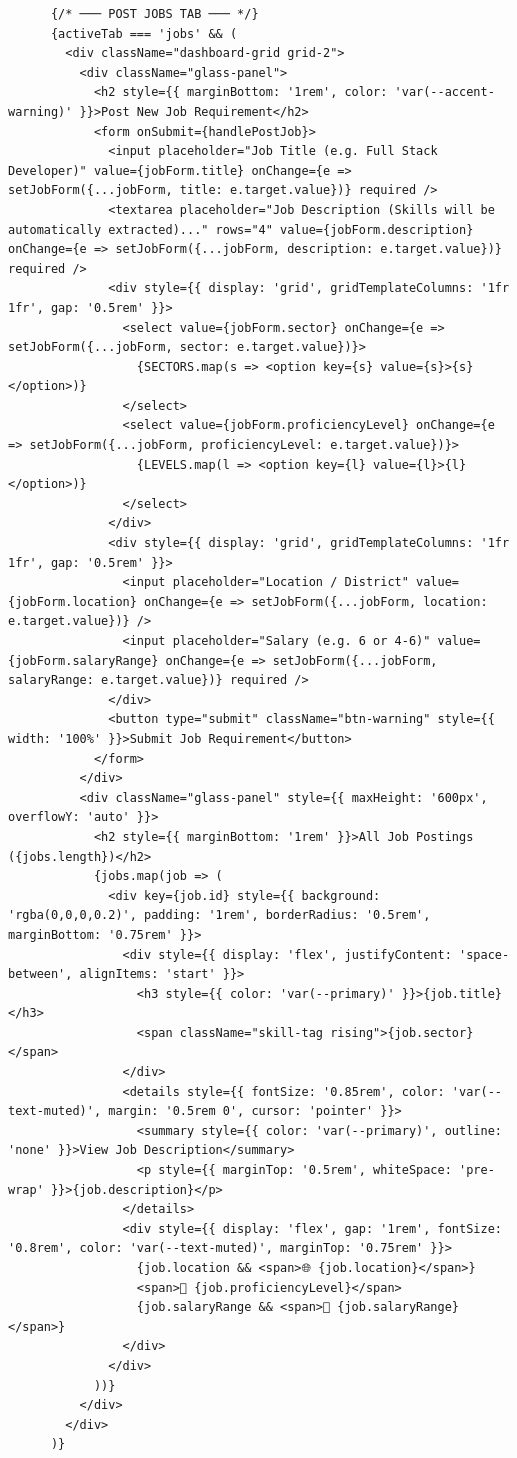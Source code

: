 \documentclass[12pt,a4paper]{report}
\begin{document}
\begin{verbatim}
      {/* ─── POST JOBS TAB ─── */}
      {activeTab === 'jobs' && (
        <div className="dashboard-grid grid-2">
          <div className="glass-panel">
            <h2 style={{ marginBottom: '1rem', color: 'var(--accent-warning)' }}>Post New Job Requirement</h2>
            <form onSubmit={handlePostJob}>
              <input placeholder="Job Title (e.g. Full Stack Developer)" value={jobForm.title} onChange={e => setJobForm({...jobForm, title: e.target.value})} required />
              <textarea placeholder="Job Description (Skills will be automatically extracted)..." rows="4" value={jobForm.description} onChange={e => setJobForm({...jobForm, description: e.target.value})} required />
              <div style={{ display: 'grid', gridTemplateColumns: '1fr 1fr', gap: '0.5rem' }}>
                <select value={jobForm.sector} onChange={e => setJobForm({...jobForm, sector: e.target.value})}>
                  {SECTORS.map(s => <option key={s} value={s}>{s}</option>)}
                </select>
                <select value={jobForm.proficiencyLevel} onChange={e => setJobForm({...jobForm, proficiencyLevel: e.target.value})}>
                  {LEVELS.map(l => <option key={l} value={l}>{l}</option>)}
                </select>
              </div>
              <div style={{ display: 'grid', gridTemplateColumns: '1fr 1fr', gap: '0.5rem' }}>
                <input placeholder="Location / District" value={jobForm.location} onChange={e => setJobForm({...jobForm, location: e.target.value})} />
                <input placeholder="Salary (e.g. 6 or 4-6)" value={jobForm.salaryRange} onChange={e => setJobForm({...jobForm, salaryRange: e.target.value})} required />
              </div>
              <button type="submit" className="btn-warning" style={{ width: '100%' }}>Submit Job Requirement</button>
            </form>
          </div>
          <div className="glass-panel" style={{ maxHeight: '600px', overflowY: 'auto' }}>
            <h2 style={{ marginBottom: '1rem' }}>All Job Postings ({jobs.length})</h2>
            {jobs.map(job => (
              <div key={job.id} style={{ background: 'rgba(0,0,0,0.2)', padding: '1rem', borderRadius: '0.5rem', marginBottom: '0.75rem' }}>
                <div style={{ display: 'flex', justifyContent: 'space-between', alignItems: 'start' }}>
                  <h3 style={{ color: 'var(--primary)' }}>{job.title}</h3>
                  <span className="skill-tag rising">{job.sector}</span>
                </div>
                <details style={{ fontSize: '0.85rem', color: 'var(--text-muted)', margin: '0.5rem 0', cursor: 'pointer' }}>
                  <summary style={{ color: 'var(--primary)', outline: 'none' }}>View Job Description</summary>
                  <p style={{ marginTop: '0.5rem', whiteSpace: 'pre-wrap' }}>{job.description}</p>
                </details>
                <div style={{ display: 'flex', gap: '1rem', fontSize: '0.8rem', color: 'var(--text-muted)', marginTop: '0.75rem' }}>
                  {job.location && <span>🌐 {job.location}</span>}
                  <span>🧬 {job.proficiencyLevel}</span>
                  {job.salaryRange && <span>💎 {job.salaryRange}</span>}
                </div>
              </div>
            ))}
          </div>
        </div>
      )}



\end{verbatim}
\end{document}
